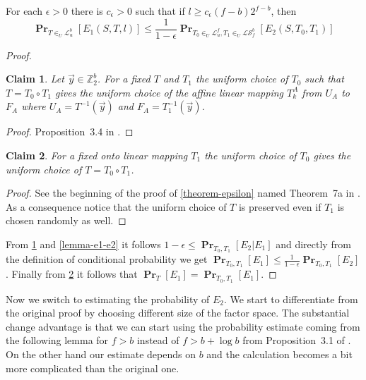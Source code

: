 \documentclass[unicode,review]{siamart1116}
\newcommand{\vecspace}[2]{\mathbb{Z}_{#1}^{#2}}
\newcommand{\binvecspace}[1]{\vecspace{2}{#1}}
\newcommand{\linearmaps}[2]{\mathcal{L}_{#1}^{#2}}
\newcommand{\surjectivelinearmaps}[2]{\mathcal{LS}_{#1}^{#2}}
\newcommand{\probs}[2]{\operatorname{\mathbf{Pr}}_{{#1}}\left[{#2}\right]}
\newtheorem{claim}{Claim}
\numberwithin{theorem}{section}
\begin{document}
\begin{corollary}
\label{corollary-e1-e2}
For each $\epsilon > 0$ there is $c_\epsilon > 0$ such that if $l \geq c_\epsilon (f - b)2^{f-b}$, then
\[
\probs{T \in_U \linearmaps{u}{b}}{E_1(S, T, l)} \leq \frac{1}{1 - \epsilon}\probs{T_0 \in_U \linearmaps{u}{f}, T_1 \in_U \surjectivelinearmaps{f}{b}}{E_2(S, T_0, T_1)}
\]
\end{corollary}
\begin{proof}
\begin{claim}
\label{claim-dstr-affine}
Let $\vec{y} \in \binvecspace{b}$. For a fixed $T$ and $T_1$ the uniform choice of $T_0$ such that $T = T_0 \circ T_1$ gives the uniform choice of the affine linear mapping $T_k^A$ from $U_A$ to $F_A$ where $U_A = T^{-1}(\vec{y})$ and $F_A = T_1^{-1}(\vec{y})$.
\end{claim}
\begin{proof}
Proposition~3.4 in \cite{alonetal}.
\end{proof}
\begin{claim}
\label{claim-dstr-factor}
For a fixed onto linear mapping $T_1$ the uniform choice of $T_0$ gives the uniform choice of $T = T_0 \circ T_1$.
\end{claim}
\begin{proof}
See the beginning of the proof of \cref{theorem-epsilon} named Theorem~7a in \cite{alonetal}.
As a consequence notice that the uniform choice of $T$ is preserved even if $T_1$ is chosen randomly as well.
\end{proof}
From \cref{claim-dstr-affine} and \cref{lemma-e1-e2} it follows $1 - \epsilon \leq \probs{T_0, T_1}{E_2 | E_1}$ and directly from the definition of conditional probability we get $\probs{T_0, T_1}{E_1} \leq \frac{1}{1-\epsilon}\probs{T_0, T_1}{E_2}$.
Finally from \cref{claim-dstr-factor} it follows that $\probs{T}{E_1} = \probs{T_0, T_1}{E_1}$.
\end{proof}

Now we switch to estimating the probability of $E_2$. 
We start to differentiate from the original proof by choosing different size of the factor space.
The substantial change advantage is that we can start using the probability estimate coming from the following lemma for $f > b$ instead of $f > b + \log b$  from Proposition~3.1 of \cite{alonetal}.
On the other hand our estimate depends on $b$ and the calculation becomes a bit more complicated than the original one.
\end{document}
